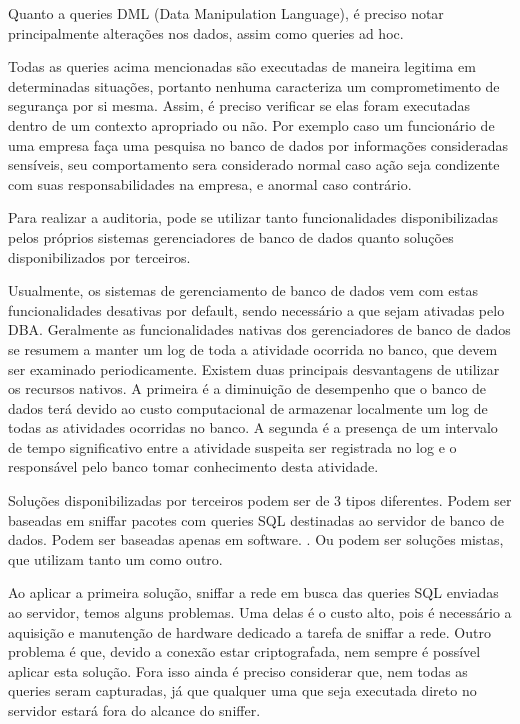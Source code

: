 \documentclass{article}
\begin{document}
Quanto a queries DML (Data Manipulation Language), é preciso notar principalmente alterações nos dados, assim como queries ad hoc.

Todas as queries acima mencionadas são executadas de maneira legitima em determinadas situações, portanto nenhuma caracteriza um comprometimento de segurança por si mesma. Assim, é preciso verificar se elas foram executadas dentro de um contexto apropriado ou não. Por exemplo caso um funcionário de uma empresa faça uma pesquisa no banco de dados por informações consideradas sensíveis, seu comportamento sera considerado normal caso ação seja condizente com suas responsabilidades na empresa, e anormal caso contrário.

Para realizar a auditoria, pode se utilizar tanto funcionalidades disponibilizadas pelos próprios sistemas gerenciadores de banco de dados quanto soluções disponibilizados por terceiros.

Usualmente, os sistemas de gerenciamento de banco de dados vem com estas funcionalidades desativas por default, sendo necessário a que sejam ativadas pelo DBA. Geralmente as funcionalidades nativas dos gerenciadores de banco de dados se resumem a manter um log de toda a atividade ocorrida no banco, que devem ser examinado periodicamente. Existem duas principais desvantagens de utilizar os recursos nativos. A primeira é a diminuição de desempenho que o banco de dados terá devido ao custo computacional de armazenar localmente um log de todas as atividades ocorridas no banco. A segunda é a presença de um intervalo de tempo significativo entre a atividade suspeita ser registrada no log e o responsável pelo banco tomar conhecimento desta atividade. 

Soluções disponibilizadas por terceiros podem ser de 3 tipos diferentes. Podem ser baseadas em sniffar pacotes com queries SQL destinadas ao servidor de banco de dados. Podem ser baseadas apenas em software. . Ou podem ser soluções mistas, que utilizam tanto um como outro.

Ao aplicar a primeira solução, sniffar a rede em busca das queries SQL enviadas ao servidor, temos alguns problemas. Uma delas é o custo alto, pois é necessário a aquisição e manutenção de hardware dedicado a tarefa de sniffar a rede. Outro problema é que, devido a conexão estar criptografada, nem sempre é possível aplicar esta solução. Fora isso ainda é preciso considerar que, nem todas as queries seram capturadas, já que qualquer  uma que seja executada direto no servidor estará fora do alcance do sniffer.
\end{document}
